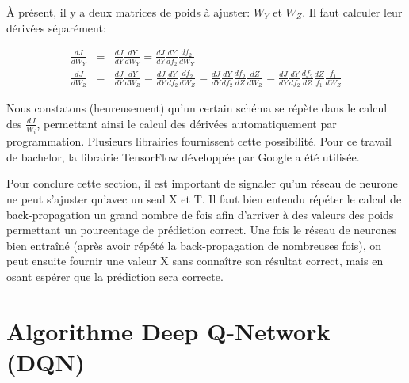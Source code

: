 \documentclass[11pt,a4paper]{report}
\begin{document}
    \par À présent, il y a deux matrices de poids à ajuster: $W_Y$ et $W_Z$. Il faut calculer leur dérivées séparément: 
    
    \begin{eqnarray}
    \frac{dJ}{dW_Y} &=& \frac{dJ}{dY} \frac{dY}{dW_Y} = \frac{dJ}{dY} \frac{dY}{df_2}\frac{df_2}{dW_Y} \\
    \frac{dJ}{dW_Z} &=& \frac{dJ}{dY} \frac{dY}{dW_Z} = \frac{dJ}{dY} \frac{dY}{df_2}\frac{df_2}{dW_Z} = \frac{dJ}{dY} \frac{dY}{df_2}\frac{df_2}{dZ}\frac{dZ}{dW_Z} = \frac{dJ}{dY} \frac{dY}{df_2}\frac{df_2}{dZ} \frac{dZ}{f_1}\frac{f_1}{dW_Z} 
    \end{eqnarray}

    \par Nous constatons (heureusement) qu'un certain schéma se répète dans le calcul des $\frac{dJ}{W_i}$, permettant ainsi le calcul des dérivées automatiquement par programmation. Plusieurs librairies fournissent cette possibilité. Pour ce travail de bachelor, la librairie TensorFlow développée par Google a été utilisée. 
    
    \par Pour conclure cette section, il est important de signaler qu'un réseau de neurone ne peut s'ajuster qu'avec un seul X et T. Il faut bien entendu répéter le calcul de back-propagation un grand nombre de fois afin d'arriver à des valeurs des poids permettant un pourcentage de prédiction correct. Une fois le réseau de neurones bien entraîné (après avoir répété la back-propagation de nombreuses fois), on peut ensuite fournir une valeur X sans connaître son résultat correct, mais en osant espérer que la prédiction sera correcte. 
  
  \section{Algorithme Deep Q-Network (DQN)}
  
\end{document}
